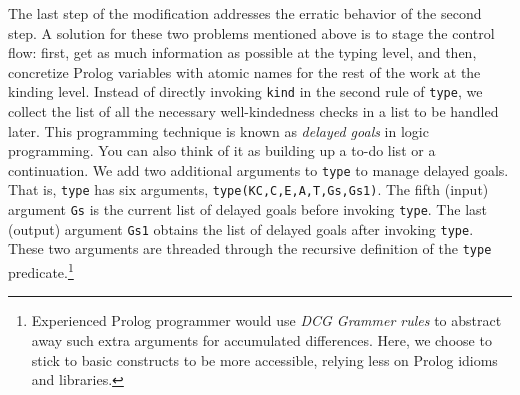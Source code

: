 \documentclass[runningheads,a4paper]{llncs}
\begin{document}
The last step of the modification addresses the erratic behavior of
the second step. A solution for these two problems mentioned above is
to stage the control flow: first, get as much information as possible
at the typing level, and then, concretize Prolog variables with atomic names
for the rest of the work at the kinding level. Instead of directly invoking
\verb|kind| in the second rule of \verb|type|, we collect the list of
all the necessary well-kindedness checks in a list to be handled later.
This programming technique is known as \emph{delayed goals}
in logic programming.
You can also think of it as building up a to-do list or a continuation.
We add two additional arguments to \verb|type| to manage delayed goals.
That is, \verb|type| has six arguments, \verb|type(KC,C,E,A,T,Gs,Gs1)|.
The fifth (input) argument \verb|Gs| is the current list of delayed goals
before invoking \verb|type|. The last (output) argument \verb|Gs1| obtains
the list of delayed goals after invoking \verb|type|. These two arguments
are threaded through the recursive definition of
the \verb|type| predicate.\footnote{
  Experienced Prolog programmer would use
  \emph{DCG Grammer rules} \cite{SWIPrologManual} to abstract away
  such extra arguments for accumulated differences.
  Here, we choose to stick to basic constructs to be more accessible,
  relying less on Prolog idioms and libraries.}
\end{document}
